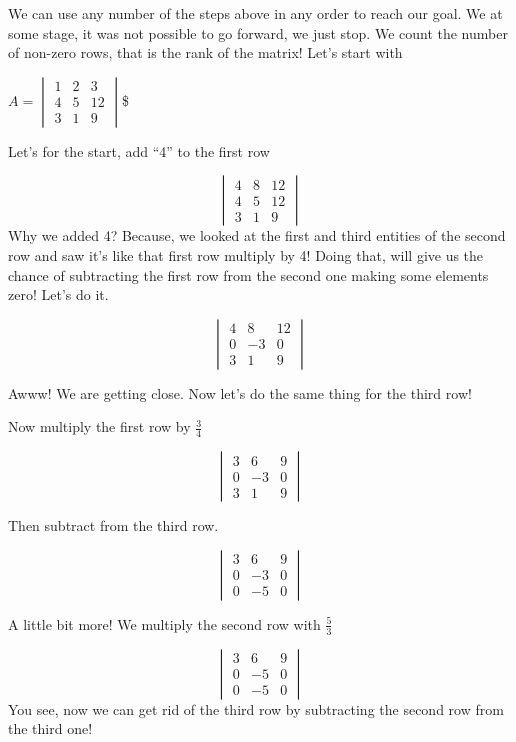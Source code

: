 \documentclass[
]{book}
\theoremstyle{definition}
\theoremstyle{definition}
\theoremstyle{definition}
\theoremstyle{remark}
\begin{document}
We can use any number of the steps above in any order to reach our goal. We at some stage, it was not possible to go forward, we just stop. We count the number of non-zero rows, that is the rank of the matrix! Let's start with

\(A=\begin{vmatrix} 1&2&3\\4&5&12\\3&1&9\end{vmatrix}\)\$

Let's for the start, add ``4'' to the first row

\[\begin{vmatrix} 4&8&12\\4&5&12\\3&1&9\end{vmatrix}\]
Why we added 4? Because, we looked at the first and third entities of the second row and saw it's like that first row multiply by 4! Doing that, will give us the chance of subtracting the first row from the second one making some elements zero! Let's do it.

\[\begin{vmatrix} 4&8&12\\0&-3&0\\3&1&9\end{vmatrix}\]

Awww! We are getting close. Now let's do the same thing for the third row!

Now multiply the first row by \(\frac{3}{4}\)

\[\begin{vmatrix} 3&6&9\\0&-3&0\\3&1&9\end{vmatrix}\]

Then subtract from the third row.

\[\begin{vmatrix} 3&6&9\\0&-3&0\\0&-5&0\end{vmatrix}\]

A little bit more! We multiply the second row with \(\frac{5}{3}\)

\[\begin{vmatrix} 3&6&9\\0&-5&0\\0&-5&0\end{vmatrix}\]
You see, now we can get rid of the third row by subtracting the second row from the third one!
\end{document}
